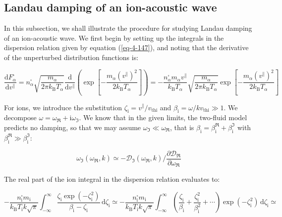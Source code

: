 \subsection{Landau damping of an ion-acoustic wave}

In this subsection, we shall illustrate the procedure for studying Landau damping of an ion-acoustic wave. We first begin by setting up the integrals in the dispersion relation given by equation (\ref{eq-4-147}), and noting that the derivative of the unperturbed distribution functions is:

\begin{equation}
    \frac{\mathrm{d}F_\alpha^\square}{\mathrm{d}v^\parallel}=n_\alpha^\square\sqrt{\frac{m_\alpha}{2\pi k_\mathrm{B}T_\alpha}}\frac{\mathrm{d}}{\mathrm{d}v^\parallel}\left(\exp{\left[-\frac{m_\alpha (v^\parallel)^2}{2k_\mathrm{B}T_\alpha}\right]}\right)=-\frac{n_\alpha^\square m_\alpha v^\parallel}{k_\mathrm{B}T_\alpha}\sqrt{\frac{m_\alpha}{2\pi k_\mathrm{B}T_\alpha}}\exp{\left[-\frac{m_\alpha(v^\parallel)^2}{2k_\mathrm{B}T_\alpha}\right]}
\end{equation}

For ions, we introduce the substitution $\zeta_\mathrm{i}=v^\parallel/v_\text{thi}$ and $\beta_\mathrm{i}=\omega/kv_\text{thi}\gg1$. We decompose $\omega=\omega_\Re+\mathrm{i}\omega_\Im$. We know that in the given limits, the two-fluid model predicts no damping, so that we may assume $\omega_\Im\ll\omega_\Re$, that is $\beta_\mathrm{i}=\beta_\mathrm{i}^\Re+\beta_\mathrm{i}^\Im$ with $\beta_\mathrm{i}^\Re\gg\beta_\mathrm{i}^\Im$:

\begin{equation}
    \omega_\Im(\omega_\Re,k)\simeq-\mathcal{D}_\Im(\omega_\Re,k)\bigg/\frac{\partial \mathcal{D}_\Re}{\partial \omega_\Re}
\end{equation}

The real part of the ion integral in the dispersion relation evaluates to:

\begin{equation}
    -\frac{n_\mathrm{i}^\square m_\mathrm{i}}{k_\mathrm{B}T_\mathrm{i}k\sqrt{\pi}}\int_{-\infty}^\infty\frac{\zeta_\mathrm{i}\exp{(-\zeta_\mathrm{i}^2)}}{\beta_\mathrm{i}-\zeta_\mathrm{i}}\,\mathrm{d}\zeta_\mathrm{i}\simeq-\frac{n_\mathrm{i}^\square m_\mathrm{i}}{k_\mathrm{B}T_\mathrm{i}k\sqrt{\pi}}\int_{-\infty}^\infty\left(\frac{\zeta_\mathrm{i}}{\beta_\mathrm{i}}+\frac{\zeta_\mathrm{i}^2}{\beta_\mathrm{i}^2}+\cdots\right)\exp{(-\zeta_\mathrm{i}^2)}\,\mathrm{d}\zeta_\mathrm{i}\simeq
\end{equation}

